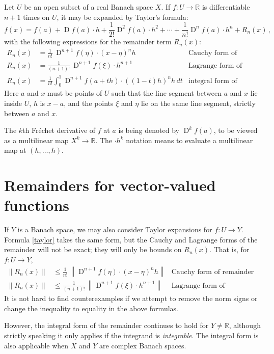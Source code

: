 \documentclass[12pt]{article}
\newcommand{\real}{\mathbb{R}}
\providecommand{\norm}[1]{\lVert#1\rVert}
\providecommand{\normW}[1]{\left\lVert#1\right\rVert}
\DeclareMathOperator{\D}{D}
\begin{document}
Let $U$ be an open subset of a real Banach space $X$.
If $f\colon U \to \real$ is differentiable $n+1$ times on  $U$,
it may be expanded by Taylor's formula:
\begin{equation}\label{taylor}
f(x) = f(a) + \D f(a) \cdot h + \frac{1}{2!} \D^2 f(a) \cdot h^2
+ \dotsb + \frac{1}{n!} \D^n f(a) \cdot h^n + R_n(x)\,,
\end{equation}
with the following expressions for the remainder term $R_n(x)$:
\begin{align*}
R_n(x) &= \frac{1}{n!} \, \D^{n+1}f(\eta) \cdot (x-\eta)^n h & \text{Cauchy form of remainder} \\
R_n(x) &= \frac{1}{(n+1)!} \, \D^{n+1}f(\xi) \cdot h^{n+1} & \text{Lagrange form of remainder} \\
R_n(x) &= \frac{1}{n!} \int_0^1 \D^{n+1} f(a+th) \cdot ((1-t)h)^n h \, dt & \text{integral form of remainder}
\end{align*}
Here $a$ and $x$ must be points of $U$ such that the line segment
between $a$ and $x$ lie inside $U$, $h$ is $x-a$,
and the points $\xi$ and $\eta$ lie on the same line segment,
strictly between $a$ and $x$.

The $k$th Fr\'echet derivative of $f$ at $a$ is being denoted by
$\D^k f(a)$, to be viewed as a multilinear map $X^k \to \real$.
The $\cdot h^k$ notation means to evaluate a multilinear map
at $(h, \dotsc, h)$.

\section{Remainders for vector-valued functions}
If $Y$ is a Banach space, we may also consider
Taylor expansions for $f\colon U \to Y$.
Formula \eqref{taylor} takes the same form,
but the Cauchy and Lagrange forms of the remainder
will not be exact;
they will only be bounds on $R_n(x)$.
That is, for $f\colon U \to Y$,
\begin{align*}
\norm{R_n(x)} &\leq \frac{1}{n!} \, \normW{\D^{n+1}f(\eta) \cdot (x-\eta)^n h} & \text{Cauchy form of remainder} \\
\norm{R_n(x)} &\leq \frac{1}{(n+1)!} \, \normW{\D^{n+1}f(\xi) \cdot h^{n+1}} & \text{Lagrange form of remainder}
\end{align*}
It is not hard to find counterexamples if we attempt to remove the norm signs or change
the inequality to equality in the above formulas.  

However, the integral form of the remainder continues to hold for $Y \neq \real$,
although strictly speaking it only applies if the integrand is \emph{integrable}.
The integral form is also applicable when $X$ and $Y$ are complex Banach spaces.
\end{document}
